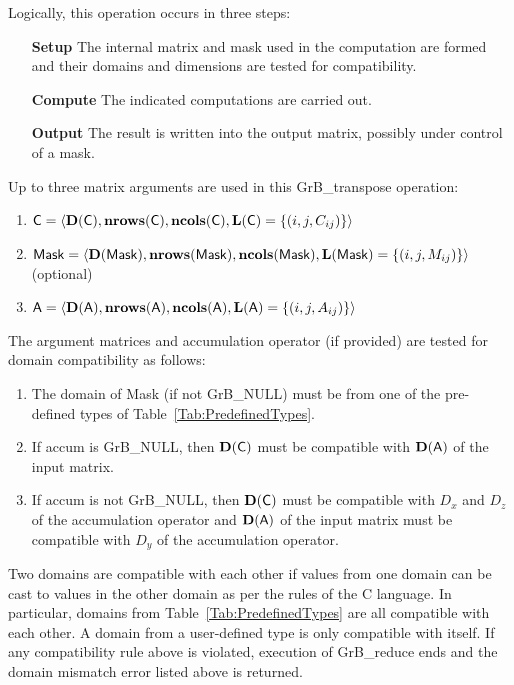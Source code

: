 Logically, this operation occurs in three steps:
\begin{enumerate}[leftmargin=0.75in]
\item[\bf Setup] The internal matrix and mask used in the computation are formed 
and their domains and dimensions are tested for compatibility.
\item[\bf Compute] The indicated computations are carried out.
\item[\bf Output] The result is written into the output matrix, possibly under 
control of a mask.
\end{enumerate}

Up to three matrix arguments are used in this {\sf GrB\_transpose} operation:
\begin{enumerate}

	\item ${\sf C} = \langle \bold{D}({\sf C}),\bold{nrows}({\sf C}),
    \bold{ncols}({\sf C}),\bold{L}({\sf C}) = \{(i,j,C_{ij}) \} \rangle$

	\item ${\sf Mask} = \langle \bold{D}({\sf Mask}),\bold{nrows}({\sf Mask}),
		\bold{ncols}({\sf Mask}),\bold{L}({\sf Mask}) = \{(i,j,M_{ij}) \} \rangle$ (optional)

	\item ${\sf A} = \langle \bold{D}({\sf A}),\bold{nrows}({\sf A}),
    \bold{ncols}({\sf A}),\bold{L}({\sf A}) = \{(i,j,A_{ij}) \} \rangle$
\end{enumerate}

The argument matrices and accumulation 
operator (if provided) are tested for domain compatibility as follows:
\begin{enumerate}
	\item The domain of {\sf Mask} (if not {\sf GrB\_NULL}) must be from one of 
    the pre-defined types of Table~\ref{Tab:PredefinedTypes}.

	\item If {\sf accum} is {\sf GrB\_NULL}, then $\bold{D}({\sf C})$ must be 
		compatible with $\bold{D}({\sf A})$ of the input matrix.

	\item If {\sf accum} is not {\sf GrB\_NULL}, then $\bold{D}({\sf C})$ must be
    compatible with $D_x$ and $D_z$ of the accumulation operator and 
    $\bold{D}({\sf A})$ of the input matrix must be compatible with $D_y$ of the accumulation operator.

\end{enumerate}
Two domains are compatible with each other if values from one domain can be cast 
to values in the other domain as per the rules of the C language.
In particular, domains from Table~\ref{Tab:PredefinedTypes} are all compatible 
with each other. A domain from a user-defined type is only compatible with itself.
If any compatibility rule above is violated, execution of {\sf GrB\_reduce} ends
and the domain mismatch error listed above is returned.

